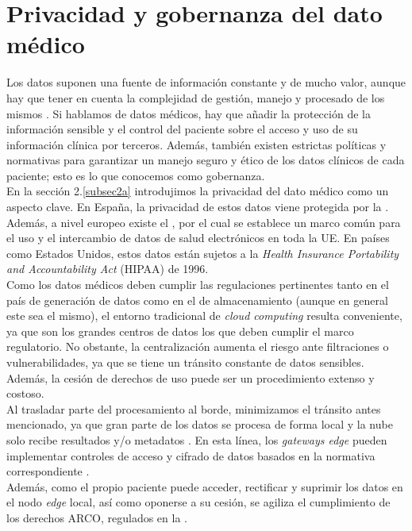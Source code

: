 \documentclass[twoside, 12pt]{opticajnl}
\begin{document}
\section{Privacidad y gobernanza del dato médico}

Los datos suponen una fuente de información constante y de mucho valor, aunque hay que tener en cuenta la complejidad de gestión, manejo y procesado de los mismos . Si hablamos de datos médicos, hay que añadir la protección de la información sensible y el control del paciente sobre el acceso y uso de su información clínica por terceros. Además, también existen estrictas políticas y normativas para garantizar un manejo seguro y ético de los datos clínicos de cada paciente; esto es lo que conocemos como gobernanza. \\

En la sección 2.\ref{subsec2a} introdujimos la privacidad del dato médico como un aspecto clave. En España, la privacidad de estos datos viene protegida por la \cite{BOE}. Además, a nivel europeo existe el \cite{EEDS}, por el cual se establece un marco común para el uso y el intercambio de datos de salud electrónicos en toda la UE. En países como Estados Unidos, estos datos están sujetos a la \textit{Health Insurance Portability and Accountability Act} (HIPAA) de 1996. \\

Como los datos médicos deben cumplir las regulaciones pertinentes tanto en el país de generación de datos como en el de almacenamiento (aunque en general este sea el mismo), el entorno tradicional de \textit{cloud computing} resulta conveniente, ya que son los grandes centros de datos los que deben cumplir el marco regulatorio. No obstante, la centralización aumenta el riesgo ante filtraciones o vulnerabilidades, ya que se tiene un tránsito constante de datos sensibles. Además, la cesión de derechos de uso puede ser un procedimiento extenso y costoso. \\

Al trasladar parte del procesamiento al borde, minimizamos el tránsito antes mencionado, ya que gran parte de los datos se procesa de forma local y la nube solo recibe resultados y/o metadatos . En esta línea, los \textit{gateways edge} pueden implementar controles de acceso y cifrado de datos basados en la normativa correspondiente . \\

Además, como el propio paciente puede acceder, rectificar y suprimir los datos en el nodo \textit{edge} local, así como oponerse a su cesión, se agiliza el cumplimiento de los derechos ARCO, regulados en la \citealp[Arts.~12–15, 18]{BOE}. \\
\end{document}
